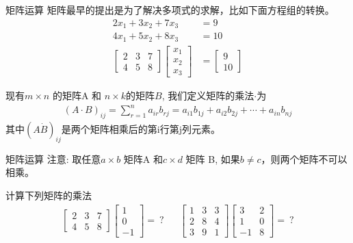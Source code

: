 \documentclass[handout]{beamer}
\begin{document}
\begin{frame}{矩阵运算}
矩阵最早的提出是为了解决多项式的求解，比如下面方程组的转换。
\begin{align*}
	2x_1 + 3x_2 + 7x_3 & = 9 \\
	4x_1 + 5x_2 + 8 x_3 & = 10 \\
	\begin{bmatrix}
		2 & 3 & 7 \\
		4 & 5 & 8 
	\end{bmatrix} \begin{bmatrix}
		x_1 \\
		x_2 \\
		x_3 
	\end{bmatrix} & = \begin{bmatrix}
		 9 \\
		 10 
	\end{bmatrix}
\end{align*}

\begin{definition}
	现有$m \times n$ 的矩阵A 和 $n \times k$的矩阵$B$, 我们定义矩阵的乘法$\cdot$为
	\begin{align*}
		(A \cdot B)_{ij} = \sum_{r=1}^n a_{ir}b_{rj} = a_{i1}b_{1j} + a_{i2}b_{2j} + \cdots + a_{in}b_{nj}
	\end{align*}
	其中$(A \dot B)_{ij}$是两个矩阵相乘后的第i行第j列元素。
\end{definition}	
\end{frame}

\begin{frame}{矩阵运算}
注意: 取任意$a \times b$ 矩阵A 和$c \times d$ 矩阵 B, 如果$b \neq c$，则两个矩阵不可以相乘。	

\hfil 

\begin{example}
计算下列矩阵的乘法
\begin{align*}
	\begin{bmatrix}
		2 & 3 & 7 \\
		4 & 5 & 8 
	\end{bmatrix} \begin{bmatrix}
		1 \\
		0 \\
		-1 
	\end{bmatrix} = \ ? & & \begin{bmatrix}
		1 & 3 & 3 \\
		2 & 8 & 4 \\
		3 & 9 & 1 
	\end{bmatrix} \begin{bmatrix}
		3 & 2 \\
		1 & 0 \\
		-1 & 8 
	\end{bmatrix} = \ ?
\end{align*}	
\end{example}
\end{frame}
\end{document}

